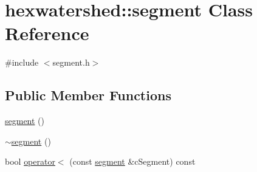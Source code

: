 \hypertarget{classhexwatershed_1_1segment}{\section{hexwatershed\-:\-:segment Class Reference}
\label{classhexwatershed_1_1segment}
}


{\ttfamily \#include $<$segment.\-h$>$}

\subsection*{Public Member Functions}
\begin{DoxyCompactItemize}
\item 
\hyperlink{classhexwatershed_1_1segment_a1f33851d1a3e9d1a7d76442662b8f9ef}{segment} ()
\item 
\hyperlink{classhexwatershed_1_1segment_af0a33aff39a8d36dd8c401b607fa2f3b}{$\sim$segment} ()
\item 
bool \hyperlink{classhexwatershed_1_1segment_a537893160b9da97cf5d4b256de74ba7b}{operator$<$} (const \hyperlink{classhexwatershed_1_1segment}{segment} \&c\-Segment) const 
\end{DoxyCompactItemize}
